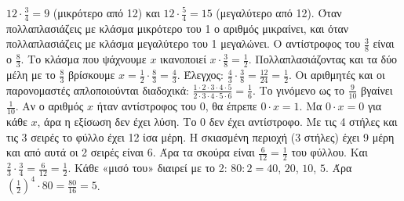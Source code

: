  $12\cdot\frac{3}{4}=9$ (μικρότερο από 12) και $12\cdot\frac{5}{4}=15$ (μεγαλύτερο από 12). Όταν πολλαπλασιάζεις με κλάσμα μικρότερο του 1 ο αριθμός μικραίνει, και όταν πολλαπλασιάζεις με κλάσμα μεγαλύτερο του 1 μεγαλώνει.
 Ο αντίστροφος του $\frac{3}{8}$ είναι ο $\frac{8}{3}$. Το κλάσμα που ψάχνουμε $x$ ικανοποιεί $x\cdot\frac{3}{8}=\frac{1}{2}$. Πολλαπλασιάζοντας και τα δύο μέλη με το $\frac{8}{3}$ βρίσκουμε $x=\frac{1}{2}\cdot\frac{8}{3}=\frac{4}{3}$. Έλεγχος: $\frac{4}{3}\cdot\frac{3}{8}=\frac{12}{24}=\frac{1}{2}$.
 Οι αριθμητές και οι παρονομαστές απλοποιούνται διαδοχικά: $\frac{1\cdot 2\cdot 3\cdot 4\cdot 5}{2\cdot 3\cdot 4\cdot 5\cdot 6}=\frac{1}{6}$. Το γινόμενο ως το $\frac{9}{10}$ βγαίνει $\frac{1}{10}$.
 Αν ο αριθμός $x$ ήταν αντίστροφος του 0, θα έπρεπε $0\cdot x=1$. Μα $0\cdot x=0$ για κάθε $x$, άρα η εξίσωση δεν έχει λύση. Το 0 δεν έχει αντίστροφο.
 Με τις 4 στήλες και τις 3 σειρές το φύλλο έχει 12 ίσα μέρη. Η σκιασμένη περιοχή (3 στήλες) έχει 9 μέρη και από αυτά οι 2 σειρές είναι 6. Άρα τα σκούρα είναι $\frac{6}{12}=\frac{1}{2}$ του φύλλου. Και $\frac{2}{3}\cdot\frac{3}{4}=\frac{6}{12}=\frac{1}{2}$.
 Κάθε «μισό του» διαιρεί με το 2: $80:2=40$, $20$, $10$, $5$. Άρα $\left(\frac{1}{2}\right)^4\cdot 80=\frac{80}{16}=5$.
